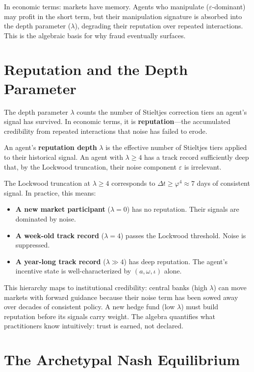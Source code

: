 In economic terms: markets have memory. Agents who manipulate ($\varepsilon$-dominant) may profit in the short term, but their manipulation signature is absorbed into the depth parameter ($\lambda$), degrading their reputation over repeated interactions. This is the algebraic basis for why fraud eventually surfaces.

\section{Reputation and the Depth Parameter}

The depth parameter $\lambda$ counts the number of Stieltjes correction tiers an agent's signal has survived. In economic terms, it is \textbf{reputation}---the accumulated credibility from repeated interactions that noise has failed to erode.

\begin{definition}
An agent's \textbf{reputation depth} $\lambda$ is the effective number of Stieltjes tiers applied to their historical signal. An agent with $\lambda \geq 4$ has a track record sufficiently deep that, by the Lockwood truncation, their noise component $\varepsilon$ is irrelevant.
\end{definition}

The Lockwood truncation at $\lambda \geq 4$ corresponds to $\Delta t \geq \varphi^4 \approx 7$ days of consistent signal. In practice, this means:
\begin{itemize}[noitemsep]
    \item \textbf{A new market participant} ($\lambda = 0$) has no reputation. Their signals are dominated by noise.
    \item \textbf{A week-old track record} ($\lambda = 4$) passes the Lockwood threshold. Noise is suppressed.
    \item \textbf{A year-long track record} ($\lambda \gg 4$) has deep reputation. The agent's incentive state is well-characterized by $(a, \omega, \iota)$ alone.
\end{itemize}

This hierarchy maps to institutional credibility: central banks (high $\lambda$) can move markets with forward guidance because their noise term has been sowed away over decades of consistent policy. A new hedge fund (low $\lambda$) must build reputation before its signals carry weight. The algebra quantifies what practitioners know intuitively: trust is earned, not declared.

\section{The Archetypal Nash Equilibrium}

